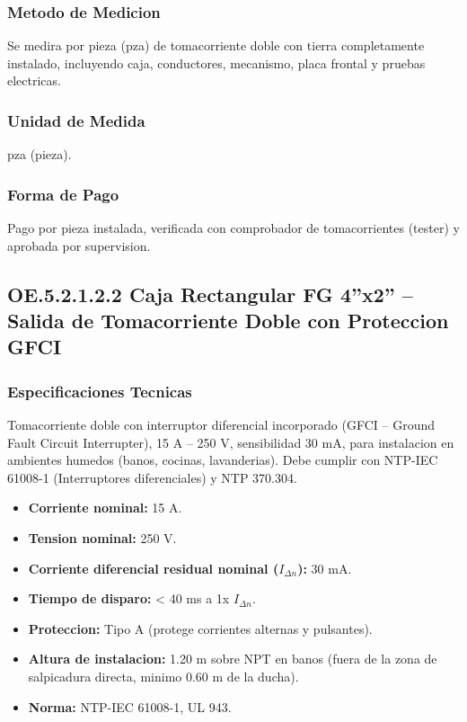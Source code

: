 \subsubsection{Metodo de Medicion}

Se medira por pieza (pza) de tomacorriente doble con tierra completamente instalado, incluyendo caja, conductores, mecanismo, placa frontal y pruebas electricas.

\subsubsection{Unidad de Medida}

pza (pieza).

\subsubsection{Forma de Pago}

Pago por pieza instalada, verificada con comprobador de tomacorrientes (tester) y aprobada por supervision.

\subsection{OE.5.2.1.2.2 Caja Rectangular FG 4''x2'' -- Salida de Tomacorriente Doble con Proteccion GFCI}

\subsubsection{Especificaciones Tecnicas}

Tomacorriente doble con interruptor diferencial incorporado (GFCI -- Ground Fault Circuit Interrupter), 15 A -- 250 V, sensibilidad 30 mA, para instalacion en ambientes humedos (banos, cocinas, lavanderias). Debe cumplir con NTP-IEC 61008-1 (Interruptores diferenciales) y NTP 370.304.

\begin{itemize}[nosep]
  \item \textbf{Corriente nominal:} 15 A.
  \item \textbf{Tension nominal:} 250 V.
  \item \textbf{Corriente diferencial residual nominal ($I_{\Delta n}$):} 30 mA.
  \item \textbf{Tiempo de disparo:} < 40 ms a 1x $I_{\Delta n}$.
  \item \textbf{Proteccion:} Tipo A (protege corrientes alternas y pulsantes).
  \item \textbf{Altura de instalacion:} 1.20 m sobre NPT en banos (fuera de la zona de salpicadura directa, minimo 0.60 m de la ducha).
  \item \textbf{Norma:} NTP-IEC 61008-1, UL 943.
\end{itemize}

